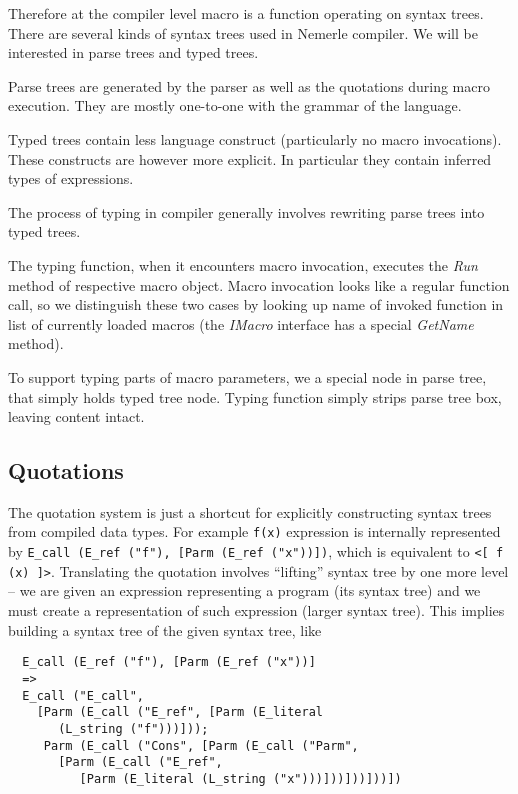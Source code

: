 \documentclass{llncs}
\begin{document}
Therefore at the compiler level macro is a function operating on
syntax trees. There are several kinds of syntax trees used in Nemerle
compiler. We will be interested in parse trees and typed trees.

Parse trees are generated by the parser as well as the quotations during
macro execution. They are mostly one-to-one with the grammar of the
language.

Typed trees contain less language construct (particularly no macro
invocations). These constructs are however more explicit. In particular
they contain inferred types of expressions.

The process of typing in compiler generally involves rewriting parse
trees into typed trees.

The typing function, when it encounters macro invocation, executes the
\emph{Run} method of respective macro object. Macro invocation looks
like a regular function call, so we distinguish these two cases by
looking up name of invoked function in list of currently loaded macros
(the \emph{IMacro} interface has a special \emph{GetName} method).

To support typing parts of macro parameters, we a special node in parse
tree, that simply holds typed tree node. Typing function simply strips
parse tree box, leaving content intact.


\subsection{Quotations}
The quotation system is just a shortcut for explicitly constructing syntax
trees from compiled data types.  For example \verb,f(x),
expression is internally represented by 
\verb.E_call (E_ref ("f"), [Parm (E_ref ("x"))]).,
which is equivalent to \verb,<[ f (x) ]>,. Translating the quotation involves
``lifting'' syntax tree by one more level -- we are given an expression 
representing a program (its syntax tree) and we must create a representation 
of such expression (larger syntax tree).
This implies building a syntax tree of the given syntax tree, like

\begin{verbatim}
  E_call (E_ref ("f"), [Parm (E_ref ("x"))] 
  =>
  E_call ("E_call", 
    [Parm (E_call ("E_ref", [Parm (E_literal 
       (L_string ("f")))]));
     Parm (E_call ("Cons", [Parm (E_call ("Parm", 
       [Parm (E_call ("E_ref", 
          [Parm (E_literal (L_string ("x")))]))]))]))])
\end{verbatim}
\end{document}

